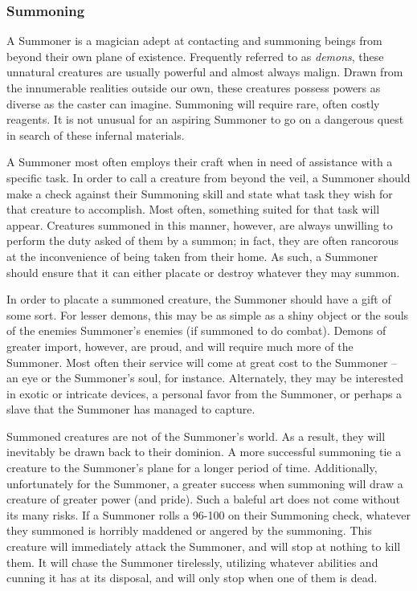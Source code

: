 \documentclass[oneside]{book}
\begin{document}
\begin{multicols}{2}
\subsubsection{Summoning}
A Summoner is a magician adept at contacting and summoning beings from beyond their own plane of existence. Frequently referred to as \emph{demons}, these unnatural creatures are usually powerful and almost always malign. Drawn from the innumerable realities outside our own, these creatures possess powers as diverse as the caster can imagine. Summoning will require rare, often costly reagents. It is not unusual for an aspiring Summoner to go on a dangerous quest in search of these infernal materials.

A Summoner most often employs their craft when in need of assistance with a specific task. In order to call a creature from beyond the veil, a Summoner should make a check against their Summoning skill and state what task they wish for that creature to accomplish. Most often, something suited for that task will appear. Creatures summoned in this manner, however, are always unwilling to perform the duty asked of them by a summon; in fact, they are often rancorous at the inconvenience of being taken from their home. As such, a Summoner should ensure that it can either placate or destroy whatever they may summon. 

In order to placate a summoned creature, the Summoner should have a gift of some sort. For lesser demons, this may be as simple as a shiny object or the souls of the enemies Summoner's enemies (if summoned to do combat). Demons of greater import, however, are proud, and will require much more of the Summoner. Most often their service will come at great cost to the Summoner -- an eye or the Summoner's soul, for instance. Alternately, they may be interested in exotic or intricate devices, a personal favor from the Summoner, or perhaps a slave that the Summoner has managed to capture. 

Summoned creatures are not of the Summoner's world. As a result, they will inevitably be drawn back to their dominion. A more successful summoning tie a creature to the Summoner's plane for a longer period of time. Additionally, unfortunately for the Summoner, a greater success when summoning will draw a creature of greater power (and pride). Such a baleful art does not come without its many risks. If a Summoner rolls a 96-100 on their Summoning check, whatever they summoned is horribly maddened or angered by the summoning. This creature will immediately attack the Summoner, and will stop at nothing to kill them. It will chase the Summoner tirelessly, utilizing whatever abilities and cunning it has at its disposal, and will only stop when one of them is dead.


\end{multicols}
\end{document}
